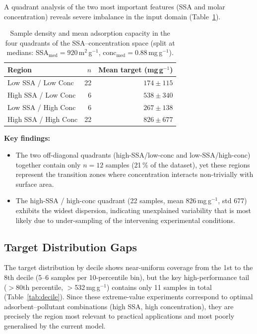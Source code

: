 \documentclass[12pt,a4paper]{article}
\begin{document}
A quadrant analysis of the two most important features (SSA and molar
concentration) reveals severe imbalance in the input domain
(Table~\ref{tab:quadrant}).

\begin{table}[h]
\centering
\caption{Sample density and mean adsorption capacity in the four quadrants
  of the SSA--concentration space (split at medians:
  SSA$_\text{med}=920$\,m$^2$\,g$^{-1}$,
  conc$_\text{med}=0.88$\,mg\,g$^{-1}$).}
\label{tab:quadrant}
\begin{tabular}{lrr}
\toprule
Region & $n$ & Mean target (mg\,g$^{-1}$) \\
\midrule
Low SSA / Low Conc   & 22 & $174 \pm 115$ \\
High SSA / Low Conc  &  6 & $538 \pm 340$ \\
Low SSA / High Conc  &  6 & $267 \pm 138$ \\
High SSA / High Conc & 22 & $826 \pm 677$ \\
\bottomrule
\end{tabular}
\end{table}

\noindent\textbf{Key findings:}
\begin{itemize}[leftmargin=*]
  \item The two off-diagonal quadrants (high-SSA/low-conc and
        low-SSA/high-conc) together contain only $n=12$ samples (21\,\%
        of the dataset), yet these regions represent the transition zones
        where concentration interacts non-trivially with surface area.
  \item The high-SSA / high-conc quadrant (22 samples, mean 826\,mg\,g$^{-1}$,
        std 677) exhibits the widest dispersion, indicating unexplained
        variability that is most likely due to under-sampling of the
        intervening experimental conditions.
\end{itemize}

\subsection{Target Distribution Gaps}

The target distribution by decile shows near-uniform coverage from the
1st to the 8th decile (5--6 samples per 10-percentile bin), but the
key high-performance tail ($>$80th percentile, $>$532\,mg\,g$^{-1}$)
contains only 11 samples in total (Table~\ref{tab:decile}).  Since these
extreme-value experiments correspond to optimal adsorbent--pollutant
combinations (high SSA, high concentration), they are precisely the
region most relevant to practical applications and most poorly
generalised by the current model.
\end{document}
